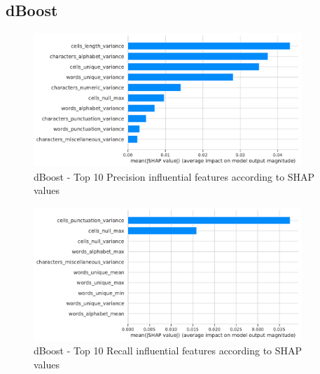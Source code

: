 \subsection{dBoost}
\begin{figure}[H]
    \centering
    \includegraphics[width=0.9\textwidth]{thesis/Figures/RQ4/Shap_cell_prec_dBoost.pdf}
    \caption{dBoost - Top 10 Precision influential features according to SHAP values}
    \label{fig:feature_importance_prec_dBoost}
\end{figure}
\begin{figure}[H]
    \centering
    \includegraphics[width=0.9\textwidth]{thesis/Figures/RQ4/Shap_cell_rec_dBoost.pdf}
    \caption{dBoost - Top 10 Recall influential features according to SHAP values}
    \label{fig:feature_importance_rec_dBoost}
\end{figure}

